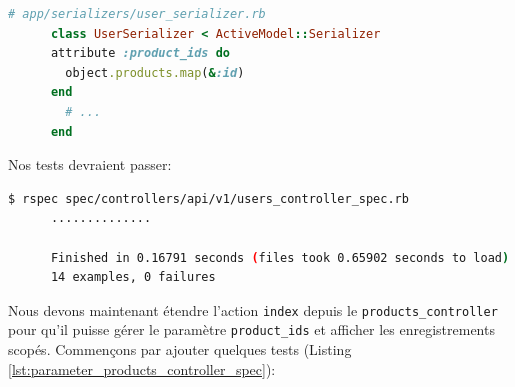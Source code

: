 \documentclass[]{report}
\begin{document}
    \begin{scriptsize}
      \begin{lstlisting}[language=ruby, caption={Implémentation pour inclures les identifiants des produits dans l'objet de l'utilisateur}, label={lst:product_ids_users_controller}]
      # app/serializers/user_serializer.rb
      class UserSerializer < ActiveModel::Serializer
      attribute :product_ids do
        object.products.map(&:id)
      end
        # ...
      end
      \end{lstlisting}
    \end{scriptsize}

    Nos tests devraient passer:

    \begin{scriptsize}
      \begin{lstlisting}[language=bash]
      $ rspec spec/controllers/api/v1/users_controller_spec.rb
      ..............

      Finished in 0.16791 seconds (files took 0.65902 seconds to load)
      14 examples, 0 failures
      \end{lstlisting}
    \end{scriptsize}

    Nous devons maintenant étendre l'action \verb|index| depuis le \verb|products_controller| pour qu'il puisse gérer le paramètre \verb|product_ids| et afficher les enregistrements scopés. Commençons par ajouter quelques tests (Listing \ref{lst:parameter_products_controller_spec}):
\end{document}

